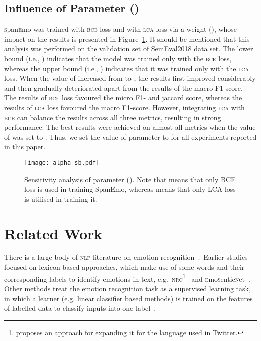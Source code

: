 \documentclass[11pt,a4paper]{article}
\begin{document}
\subsection{Influence of Parameter ()}\label{alpha_sec}
\textsc{s}pan\textsc{e}mo was trained with \textsc{bce} loss and with \textsc{lca} loss via a weight (), whose impact on the results is presented in Figure~\ref{alpha}. It should be mentioned that this analysis was performed on the validation set of SemEval2018 data set. The lower bound (i.e., ) indicates that the model was trained only with the \textsc{bce} loss, whereas the upper bound (i.e., ) indicates that it was trained only with the \textsc{lca} loss. When the value of  increased from  to , the results first improved considerably and then gradually deteriorated apart from the results of the macro F1-score. The results of \textsc{bce} loss favoured the micro F1- and jaccard score, whereas the results of \textsc{lca} loss favoured the macro F1-score. However, integrating \textsc{lca} with \textsc{bce} can balance the results across all three metrics, resulting in strong performance. The best results were achieved on almost all metrics when the value of  was set to . Thus, we set the value of parameter  to  for all experiments reported in this paper. 

\begin{figure}[ht]
   \texttt{[image: alpha\_sb.pdf]}
  \caption{Sensitivity analysis of parameter (). Note that  means that only BCE loss is used in training SpanEmo, whereas  means that only LCA loss is utilised in training it.}\label{alpha}
\end{figure}


\section{Related Work}\label{RW} 
There is a large body of \textsc{nlp} literature on emotion recognition~\cite{mohammad2015computational}.~Earlier studies focused on lexicon-based approaches, which make use of some words and their corresponding labels to identify emotions in text, e.g.~\textsc{nrc}\footnote{ proposes an approach for expanding it for the language used in Twitter.}~\cite{Mohammad13} and \textsc{e}mo\textsc{s}entic\textsc{n}et~\cite{poria2014emosenticspace}. Other methods treat the emotion recognition task as a supervised learning task, in which a learner (e.g. linear classifier based methods) is trained on the features of labelled data to classify inputs into one label~\cite{Bostan2018,Liew2016,mohammad2015sentiment,tang2013learning,wang2012harnessing,aman2007identifying}. 
\end{document}
